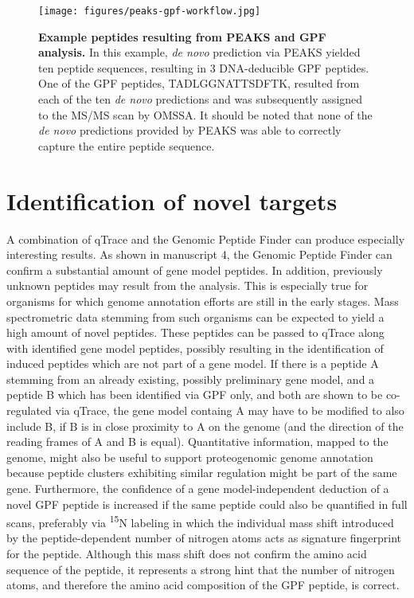 \begin{figure}
\texttt{[image: figures/peaks-gpf-workflow.jpg]}
\caption{
    {\bf Example peptides resulting from PEAKS and GPF analysis.}
    In this example, {\em de novo} prediction via PEAKS yielded
    ten peptide sequences, resulting in 3 DNA-deducible GPF peptides.
    One of the GPF peptides, TADLGGNATTSDFTK, resulted from each of
    the ten {\em de novo} predictions and was subsequently assigned
    to the MS/MS scan by OMSSA.
    It should be noted that none of the {\em de novo} predictions
    provided by PEAKS was able to correctly capture the entire peptide 
    sequence.
}
\label{fig:peaks-gpf-workflow}
\end{figure}


\section{Identification of novel targets}

A combination of qTrace and the Genomic Peptide Finder can produce especially
interesting results.
As shown in manuscript 4, the Genomic Peptide Finder can confirm a substantial
amount of gene model peptides.
In addition, previously unknown peptides may result from the analysis.
This is especially true for organisms for which genome annotation efforts
are still in the early stages.
Mass spectrometric data stemming from such organisms can be expected to
yield a high amount of novel peptides.
These peptides can be passed to qTrace along with identified gene model 
peptides, possibly resulting in the identification of induced peptides which
are not part of a gene model.
If there is a peptide A stemming from an already existing, possibly preliminary 
gene model, and a peptide B which has been identified via GPF only, and both
are shown to be co-regulated via qTrace, the gene model containg A may have to 
be modified to also include B, if B is in close proximity to A
on the genome (and the direction of the reading frames of A and B is equal).
Quantitative information, mapped to the genome, might also be useful to
support proteogenomic genome annotation because peptide clusters exhibiting 
similar regulation might be part of the same gene.
Furthermore, the confidence of a gene model-independent deduction of a novel 
GPF peptide is increased if the same peptide could also be quantified in full
scans, preferably via \textsuperscript{15}N labeling in which the individual
mass shift introduced by the peptide-dependent number of nitrogen atoms acts
as signature fingerprint for the peptide.
Although this mass shift does not confirm the amino acid sequence of the 
peptide, it represents a strong hint that the number of nitrogen atoms, and
therefore the amino acid composition of the GPF peptide, is correct.

